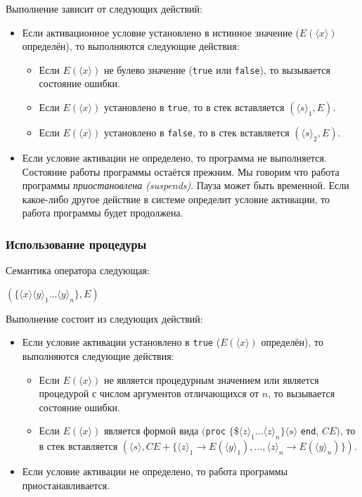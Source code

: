 Выполнение зависит от следующих действий:

\begin{itemize}
\item{Если активационное условие установлено в истинное значение ($E(\langle x \rangle)$ определён), то выполняются следующие действия:

  \begin{itemize}
\item{Если $E(\langle x \rangle)$ не булево значение (\lstinline|true| или \lstinline|false|), то вызывается состояние ошибки.}

\item{Если $E(\langle x \rangle)$ установлено в \lstinline|true|, то в стек вставляется $({\langle s \rangle}_{1}, E)$.}

\item{Если $E(\langle x \rangle)$ установлено в \lstinline|false|, то в стек вставляется $({\langle s \rangle}_{2}, E)$.}
  \end{itemize}
}

\item{Если условие активации не определено, то программа не выполняется. Состояние работы программы остаётся прежним. Мы говорим что работа программы \emph{приостановлена (suspends)}. Пауза может быть временной. Если какое-либо другое действие в системе определит условие активации, то работа программы будет продолжена.}
\end{itemize}

\subsubsection{Использование процедуры}

Семантика оператора следующая:

$(\{ \langle x \rangle {\langle y \rangle}_{1} ... {\langle y \rangle}_{n}\},E)$

Выполнение состоит из следующих действий:

\begin{itemize}
\item{Если условие активации установлено в \lstinline|true| ($E(\langle x \rangle)$ определён), то выполняются следующие действия:

  \begin{itemize}
  \item{Если $E(\langle x \rangle)$ не является процедурным значением или является процедурой с числом аргументов отличающихся от $n$, то вызывается состояние ошибки.}

  \item{Если $E(\langle x \rangle)$ является формой вида $($\lstinline|proc| $\{ \$ {\langle z \rangle}_{1} ... {\langle z \rangle}_{n}\} {\langle s \rangle}$ \lstinline|end|, $CE)$, то в стек вставляется $(\langle s \rangle, CE + \{ {\langle z \rangle}_{1} \to E({\langle y \rangle}_{1}), ..., {\langle z \rangle}_{n} \to E({\langle y \rangle}_{n})\})$.}
\end{itemize}
}

\item{Если условие активации не определено, то работа программы приостанавливается.}
\end{itemize}

